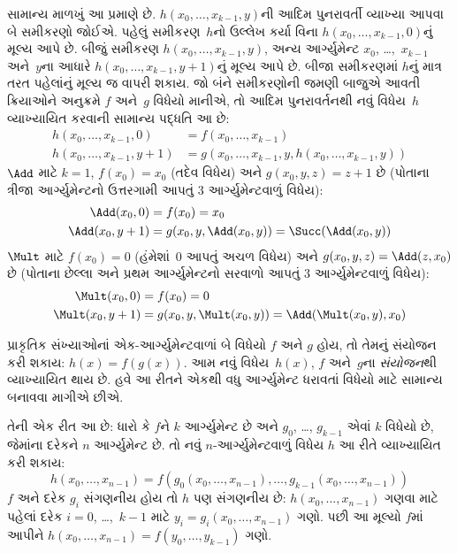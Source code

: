 સામાન્ય માળખું આ પ્રમાણે છે. $h(x_0, \dots, x_{k-1}, y)$ની આદિમ
પુનરાવર્તી વ્યાખ્યા આપવા બે સમીકરણો જોઈએ. પહેલું સમીકરણ~$h$નો
ઉલ્લેખ કર્યા વિના $h(x_0, \dots, x_{k-1}, 0)$નું મૂલ્ય આપે છે.
બીજું સમીકરણ $h(x_0, \dots, x_{k-1}, y)$, અન્ય આર્ગ્યુમેન્ટ
$x_0$, \dots,~$x_{k-1}$ અને~$y$ના આધારે
$h(x_0, \dots, x_{k-1}, y+1)$નું મૂલ્ય આપે છે. બીજા સમીકરણમાં
$h$નું માત્ર તરત પહેલાંનું મૂલ્ય જ વાપરી શકાય. જો બંને સમીકરણોની
જમણી બાજુએ આવતી ક્રિયાઓને અનુક્રમે $f$ અને~$g$ વિધેયો માનીએ,
તો આદિમ પુનરાવર્તનથી નવું વિધેય~$h$ વ્યાખ્યાયિત કરવાની સામાન્ય
પદ્ધતિ આ છે:
\begin{align*}
  h(x_0, \dots, x_{k-1}, 0) & = f(x_0, \dots, x_{k-1})\\
  h(x_0, \dots, x_{k-1}, y+1) & =
  g(x_0, \dots, x_{k-1}, y, h(x_0, \dots, x_{k-1}, y))
\end{align*}
$\Add$ માટે $k=1$, $f(x_0) = x_0$ (તદેવ વિધેય) અને
$g(x_0, y, z) = z + 1$ છે (પોતાના ત્રીજા આર્ગ્યુમેન્ટનો ઉત્તરગામી
આપતું $3$ આર્ગ્યુમેન્ટવાળું વિધેય):
\begin{align*}
  \Add(x_0, 0) & = f(x_0) = x_0\\
  \Add(x_0, y+1) & = g(x_0, y, \Add(x_0, y)) =
  \Succ(\Add(x_0, y))
\end{align*}
$\Mult$ માટે $f(x_0) = 0$ (હંમેશાં~$0$ આપતું અચળ વિધેય) અને
$g(x_0, y, z) = \Add(z,x_0)$ છે (પોતાના છેલ્લા અને પ્રથમ
આર્ગ્યુમેન્ટનો સરવાળો આપતું $3$ આર્ગ્યુમેન્ટવાળું વિધેય):
\begin{align*}
  \Mult(x_0,0) & =  f(x_0) = 0 \\
  \Mult(x_0,y+1) & =  g(x_0, y, \Mult(x_0,y)) =
  \Add(\Mult(x_0,y), x_0)
\end{align*}
\endgroup


\begingroup
\makeatletter{}\makeatother

\label{guunit:OLP-0212}


પ્રાકૃતિક સંખ્યાઓનાં એક-આર્ગ્યુમેન્ટવાળાં બે વિધેયો $f$ અને $g$ હોય,
તો તેમનું સંયોજન કરી શકાય: $h(x) = f(g(x))$. આમ નવું વિધેય~$h(x)$,
$f$ અને~$g$ના \emph{સંયોજન}થી વ્યાખ્યાયિત થાય છે. હવે આ રીતને
એકથી વધુ આર્ગ્યુમેન્ટ ધરાવતાં વિધેયો માટે સામાન્ય બનાવવા માગીએ છીએ.

તેની એક રીત આ છે: ધારો કે $f$ને $k$ આર્ગ્યુમેન્ટ છે અને
$g_0$, \dots, $g_{k-1}$ એવાં $k$ વિધેયો છે, જેમાંના દરેકને
$n$ આર્ગ્યુમેન્ટ છે. તો નવું $n$-આર્ગ્યુમેન્ટવાળું વિધેય $h$ આ રીતે
વ્યાખ્યાયિત કરી શકાય:
\[
h(x_0, \dots, x_{n-1}) =
f(g_0(x_0, \dots, x_{n-1}), \dots, g_{k-1}(x_0, \dots, x_{n-1}))
\]
$f$ અને દરેક $g_i$ સંગણનીય હોય તો $h$ પણ સંગણનીય છે:
$h(x_0, \dots, x_{n-1})$ ગણવા માટે પહેલાં દરેક $i = 0$,
\dots,~$k-1$ માટે $y_i = g_i(x_0, \dots, x_{n-1})$ ગણો.
પછી આ મૂલ્યો $f$માં આપીને
$h(x_0, \dots, x_{n-1}) = f(y_0, \dots, y_{k-1})$ ગણો.

